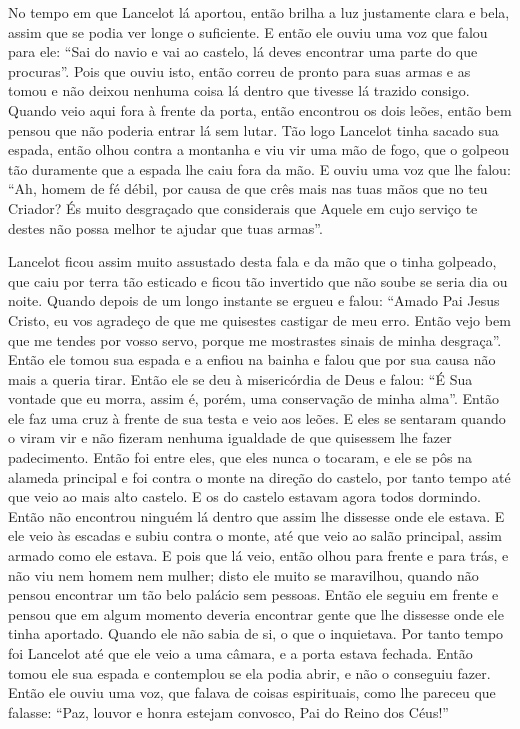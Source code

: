 No tempo em que Lancelot lá aportou, então brilha a luz justamente clara e
bela, assim que se podia ver longe o suficiente. E então ele ouviu uma voz que
falou para ele: ``Sai do navio e vai ao castelo, lá deves encontrar uma parte do
que procuras”. Pois que ouviu isto, então correu de pronto para suas
armas e as tomou e não deixou nenhuma coisa lá dentro que tivesse lá trazido
consigo. Quando veio aqui fora à frente da porta, então encontrou os dois
leões, então bem pensou que não poderia entrar lá sem lutar. Tão logo
Lancelot tinha sacado sua espada, então olhou contra a montanha e viu vir uma
mão de fogo, que o golpeou tão duramente que a espada lhe caiu fora da mão. E
ouviu uma voz que lhe falou: “Ah, homem de fé débil, por causa de que crês mais
nas tuas mãos que no teu Criador? És muito desgraçado que considerais que
Aquele em cujo serviço te destes não possa melhor te ajudar que tuas armas”. 

Lancelot ficou assim muito assustado desta fala e da mão que o tinha golpeado,
que caiu por terra tão esticado e ficou tão invertido que não soube se seria
dia ou noite. Quando depois de um longo instante se ergueu e falou: “Amado Pai
Jesus Cristo, eu vos agradeço de que me quisestes castigar de meu erro. Então
vejo bem que me tendes por vosso servo, porque me mostrastes sinais de minha
desgraça”. Então ele tomou sua espada e a enfiou na bainha e falou que por sua
causa não mais a queria tirar. Então ele se deu à misericórdia de Deus e falou:
“É Sua vontade que eu morra, assim é, porém, uma conservação de minha alma”.
Então ele faz uma cruz à frente de sua testa e veio aos leões. E eles se
sentaram quando o viram vir e não fizeram nenhuma igualdade de que quisessem
lhe fazer padecimento. Então foi entre eles, que eles nunca o tocaram, e ele se
pôs na alameda principal e foi contra o monte na direção do castelo, por tanto
tempo até que veio ao mais alto castelo. E os do castelo estavam agora todos
dormindo. Então não encontrou ninguém lá dentro que assim lhe dissesse onde ele
estava. E ele veio às escadas e subiu contra o monte, até que veio ao salão
principal, assim armado como ele estava. E pois que lá veio, então olhou para
frente e para trás, e não viu nem homem nem mulher; disto ele muito se
maravilhou, quando não pensou encontrar um tão belo palácio sem pessoas. Então
ele seguiu em frente e pensou que em algum momento deveria encontrar gente que
lhe dissesse onde ele tinha aportado. Quando ele não sabia de si, o que o
inquietava. Por tanto tempo foi Lancelot até que ele veio a uma câmara, e a
porta estava fechada. Então tomou ele sua espada e contemplou se ela podia
abrir, e não o conseguiu fazer. Então ele ouviu uma voz, que falava de coisas
espirituais, como lhe pareceu que falasse: “Paz, louvor e honra estejam
convosco, Pai do Reino dos Céus!”

